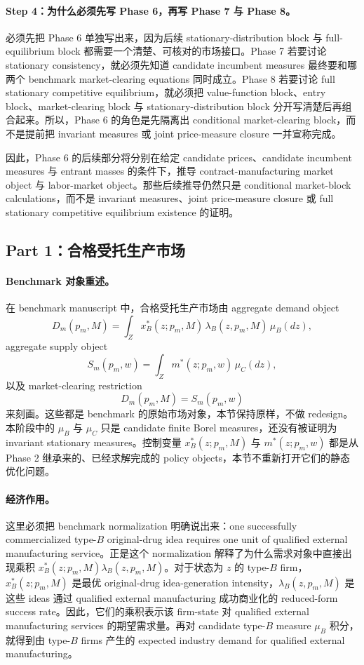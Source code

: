 \paragraph{Step 4：为什么必须先写 Phase 6，再写 Phase 7 与 Phase 8。}
必须先把 Phase 6 单独写出来，因为后续 stationary-distribution block 与 full-equilibrium block 都需要一个清楚、可核对的市场接口。Phase 7 若要讨论 stationary consistency，就必须先知道 candidate incumbent measures 最终要和哪两个 benchmark market-clearing equations 同时成立。Phase 8 若要讨论 full stationary competitive equilibrium，就必须把 value-function block、entry block、market-clearing block 与 stationary-distribution block 分开写清楚后再组合起来。所以，Phase 6 的角色是先隔离出 conditional market-clearing block，而不是提前把 invariant measures 或 joint price-measure closure 一并宣称完成。

因此，Phase 6 的后续部分将分别在给定 candidate prices、candidate incumbent measures 与 entrant masses 的条件下，推导 contract-manufacturing market object 与 labor-market object。那些后续推导仍然只是 conditional market-block calculations，而不是 invariant measures、joint price-measure closure 或 full stationary competitive equilibrium existence 的证明。

\subsection{Part 1：合格受托生产市场}

\paragraph{Benchmark 对象重述。}
在 benchmark manuscript 中，合格受托生产市场由 aggregate demand object
\[
D_m(p_m,M)=\int_Z x_B^*(z;p_m,M)\,\lambda_B(z,p_m,M)\,\mu_B(dz),
\]
aggregate supply object
\[
S_m(p_m,w)=\int_Z m^*(z;p_m,w)\,\mu_C(dz),
\]
以及 market-clearing restriction
\[
D_m(p_m,M)=S_m(p_m,w)
\]
来刻画。这些都是 benchmark 的原始市场对象，本节保持原样，不做 redesign。本阶段中的 $\mu_B$ 与 $\mu_C$ 只是 candidate finite Borel measures，还没有被证明为 invariant stationary measures。控制变量 $x_B^*(z;p_m,M)$ 与 $m^*(z;p_m,w)$ 都是从 Phase 2 继承来的、已经求解完成的 policy objects，本节不重新打开它们的静态优化问题。

\paragraph{经济作用。}
这里必须把 benchmark normalization 明确说出来：one successfully commercialized type-$B$ original-drug idea requires one unit of qualified external manufacturing service。正是这个 normalization 解释了为什么需求对象中直接出现乘积 $x_B^*(z;p_m,M)\lambda_B(z,p_m,M)$。对于状态为 $z$ 的 type-$B$ firm，$x_B^*(z;p_m,M)$ 是最优 original-drug idea-generation intensity，$\lambda_B(z,p_m,M)$ 是这些 ideas 通过 qualified external manufacturing 成功商业化的 reduced-form success rate。因此，它们的乘积表示该 firm-state 对 qualified external manufacturing services 的期望需求量。再对 candidate type-$B$ measure $\mu_B$ 积分，就得到由 type-$B$ firms 产生的 expected industry demand for qualified external manufacturing。

